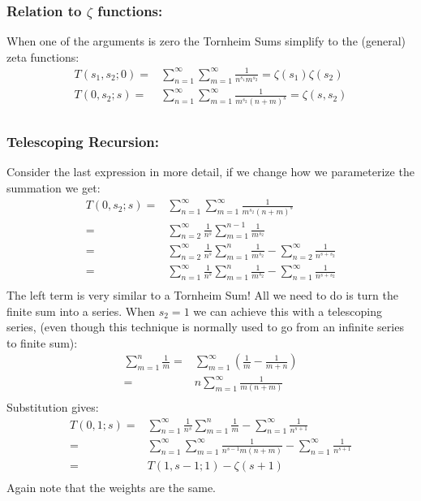 \subsubsection{Relation to $\zeta$ functions:}
When one of the arguments is zero the Tornheim Sums simplify to the (general) zeta functions:
\begin{equation*}
\begin{aligned}
	T(s_1,s_2;0) =& \sum_{n=1}^\infty\sum_{m=1}^\infty\frac{1}{n^{s_1}m^{s_2}} =\zeta(s_1)\zeta(s_2)\\
	T(0,s_2;s) =& \sum_{n=1}^\infty\sum_{m=1}^\infty\frac{1}{m^{s_2}(n+m)^s} =\zeta(s,s_2)\\
\end{aligned}
\end{equation*}

\subsubsection{Telescoping Recursion:}
Consider the last expression in more detail,
if we change how we parameterize the summation we get:
\begin{equation*}
\begin{aligned}
	T(0,s_2;s)=& \sum_{n=1}^\infty\sum_{m=1}^\infty\frac{1}{m^{s_2}(n+m)^s}\\
	=&\sum_{n=2}^\infty\frac{1}{n^s}\sum_{m=1}^{n-1}\frac{1}{m^{s_2}} \\
	=&\sum_{n=2}^\infty\frac{1}{n^s}\sum_{m=1}^n\frac{1}{m^{s_2}}-\sum_{n=2}^\infty\frac{1}{n^{s+s_2}} \\
	=&\sum_{n=1}^\infty\frac{1}{n^s}\sum_{m=1}^n\frac{1}{m^{s_2}}-\sum_{n=1}^\infty\frac{1}{n^{s+s_2}} \\
\end{aligned}
\end{equation*}
The left term is very similar to a Tornheim Sum!
All we need to do is turn the finite sum into a series.
When $s_2=1$ we can achieve this with a telescoping series,
(even though this technique is normally used to go from an infinite series to finite sum):
\begin{equation*}
\begin{aligned}
	\sum_{m=1}^{n}\frac{1}{m} =&\sum_{m=1}^\infty\left(\frac{1}{m}-\frac{1}{m+n}\right)\\
	=&n\sum_{m=1}^\infty\frac{1}{m(n+m)}\\
\end{aligned}
\end{equation*}
Substitution gives:
\begin{equation*}
\begin{aligned}
	T(0,1;s) =&\sum_{n=1}^\infty\frac{1}{n^s}\sum_{m=1}^n\frac{1}{m}-\sum_{n=1}^\infty\frac{1}{n^{s+1}} \\
	=&\sum_{n=1}^\infty\sum_{m=1}^\infty\frac{1}{n^{s-1}m(n+m)}-\sum_{n=1}^\infty\frac{1}{n^{s+1}} \\
	=&T(1,s-1;1)-\zeta(s+1)\\
\end{aligned}
\end{equation*}
Again note that the weights are the same.

